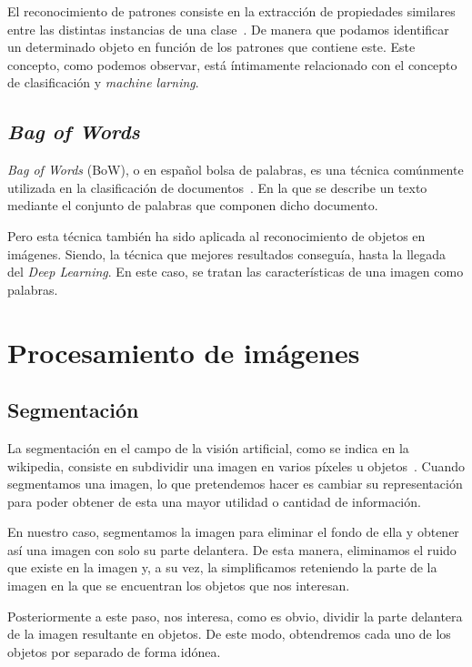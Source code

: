 El reconocimiento de patrones consiste en la extracción de propiedades similares entre las distintas instancias de una clase~\cite{wiki:patternrecognition}. De manera que podamos identificar un determinado objeto en función de los patrones que contiene este. Este concepto, como podemos observar, está íntimamente relacionado con el concepto de clasificación y \textit{machine larning}.

\subsection{\textit{Bag of Words}}

\textit{Bag of Words} (BoW), o en español bolsa de palabras, es una técnica comúnmente utilizada en la clasificación de documentos~\cite{wiki:bowmodel}. En la que se describe un texto mediante el conjunto de palabras que componen dicho documento.

Pero esta técnica también ha sido aplicada al reconocimiento de objetos en imágenes. Siendo, la técnica que mejores resultados conseguía, hasta la llegada del \textit{Deep Learning}. En este caso, se tratan las características de una imagen como palabras. 

\section{Procesamiento de imágenes}

\subsection{Segmentación}

La segmentación en el campo de la visión artificial, como se indica en la wikipedia, consiste en subdividir una imagen en varios píxeles u objetos~\cite{wiki:segmentation}.
Cuando segmentamos una imagen, lo que pretendemos hacer es cambiar su representación para poder obtener de esta una mayor utilidad o cantidad de información.

En nuestro caso, segmentamos la imagen para eliminar el fondo de ella y obtener así una imagen con solo su parte delantera. De esta manera, eliminamos el ruido que existe en la imagen y, a su vez, la simplificamos reteniendo la parte de la imagen en la que se encuentran los objetos que nos interesan.

Posteriormente a este paso, nos interesa, como es obvio, dividir la parte delantera de la imagen resultante en objetos. De este modo, obtendremos cada uno de los objetos por separado de forma idónea.

